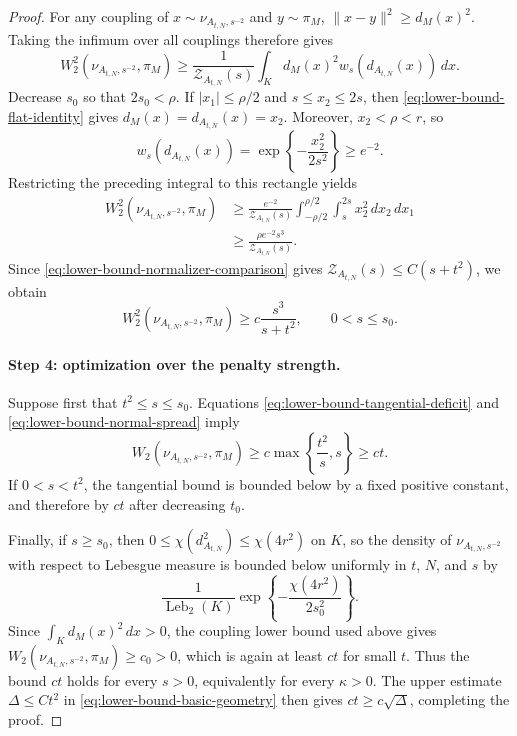 \documentclass{article}
\newcommand{\Leb}{\operatorname{Leb}}
\numberwithin{equation}{section}
\begin{document}
\begin{proof}
For any coupling of $x\sim\nu_{A_{t,N},s^{-2}}$ and $y\sim\pi_M$,
$\lVert x-y\rVert^2\ge d_M(x)^2$. Taking the infimum over all couplings
therefore gives
\[
 W_2^2(\nu_{A_{t,N},s^{-2}},\pi_M)
 \ge \frac{1}{\mathcal Z_{A_{t,N}}(s)}
 \int_K d_M(x)^2w_s(d_{A_{t,N}}(x))\,dx.
\]
Decrease $s_0$ so that $2s_0<\rho$. If
$|x_1|\le\rho/2$ and $s\le x_2\le2s$, then
\eqref{eq:lower-bound-flat-identity} gives
$d_M(x)=d_{A_{t,N}}(x)=x_2$. Moreover, $x_2<\rho<r$, so
\[
 w_s(d_{A_{t,N}}(x))
 =\exp\left\{-\frac{x_2^2}{2s^2}\right\}\ge e^{-2}.
\]
Restricting the preceding integral to this rectangle yields
\begin{align*}
 W_2^2(\nu_{A_{t,N},s^{-2}},\pi_M)
 &\ge \frac{e^{-2}}{\mathcal Z_{A_{t,N}}(s)}
 \int_{-\rho/2}^{\rho/2}\int_s^{2s}x_2^2\,dx_2\,dx_1\\
 &\ge \frac{\rho e^{-2}s^3}{\mathcal Z_{A_{t,N}}(s)}.
\end{align*}
Since \eqref{eq:lower-bound-normalizer-comparison} gives
$\mathcal Z_{A_{t,N}}(s)\le C(s+t^2)$, we obtain
\begin{equation}
 W_2^2(\nu_{A_{t,N},s^{-2}},\pi_M)
 \ge c\frac{s^3}{s+t^2},
 \qquad 0<s\le s_0.
\label{eq:lower-bound-normal-spread}
\end{equation}

\paragraph{Step 4: optimization over the penalty strength.}
Suppose first that $t^2\le s\le s_0$. Equations
\eqref{eq:lower-bound-tangential-deficit} and
\eqref{eq:lower-bound-normal-spread} imply
\[
 W_2(\nu_{A_{t,N},s^{-2}},\pi_M)
 \ge c\max\left\{\frac{t^2}{s},s\right\}
 \ge ct.
\]
If $0<s<t^2$, the tangential bound is bounded below by a fixed positive
constant, and therefore by $ct$ after decreasing $t_0$.

Finally, if $s\ge s_0$, then
$0\le\chi(d_{A_{t,N}}^2)\le\chi(4r^2)$ on $K$, so the density of
$\nu_{A_{t,N},s^{-2}}$ with respect to Lebesgue measure is bounded below
uniformly in $t$, $N$, and $s$ by
\[
 \frac{1}{\Leb_2(K)}
 \exp\left\{-\frac{\chi(4r^2)}{2s_0^2}\right\}.
\]
Since $\int_Kd_M(x)^2\,dx>0$, the coupling lower bound used above gives
$W_2(\nu_{A_{t,N},s^{-2}},\pi_M)\ge c_0>0$, which is again at least $ct$ for
small $t$. Thus the bound $ct$ holds for every $s>0$, equivalently for
every $\kappa>0$. The upper estimate
$\Delta\le Ct^2$ in \eqref{eq:lower-bound-basic-geometry} then gives
$ct\ge c\sqrt\Delta$, completing the proof.
\end{proof}
\end{document}
